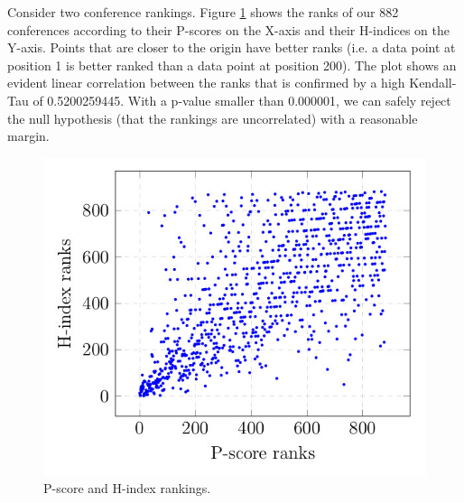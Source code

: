\documentclass[man,floatsintext]{apa6}
\begin{document}
Consider two conference rankings. Figure \ref{fig:pscore_hindex_ranks} shows the ranks of our 882 conferences according to
their P-scores
on the X-axis and their H-indices on the Y-axis. Points that are closer to the origin have better ranks (i.e. a data point at position 1 is better ranked than a data point at position 200).
The plot shows an evident linear correlation between the ranks that is confirmed
by a high Kendall-Tau of 0.5200259445. With a p-value smaller than 0.000001, we can safely reject the null 
hypothesis (that the rankings are uncorrelated) with a reasonable margin.

\begin{figure}[h!]
  \begin{center}
    \centerline{\includegraphics[scale=0.4]{rankings}}
    \caption{P-score and H-index rankings.}
    \label{fig:pscore_hindex_ranks}
  \end{center}
\end{figure}
\end{document}
